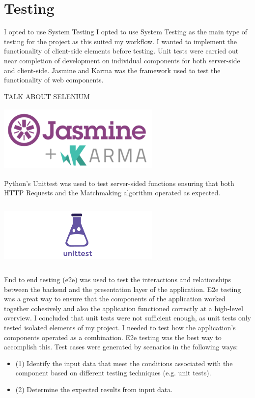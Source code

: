 \section{Testing}
I opted to use System Testing
I opted to use System Testing as the main type of testing for the project as this suited my workflow. I wanted to implement the functionality of client-side elements before testing. Unit tests were carried out near completion of development on individual components for both server-side and client-side. Jasmine and Karma was the framework used to test the functionality of web components.

TALK ABOUT SELENIUM
\begin{center}    
	\includegraphics[width=8cm,height=3.3cm,keepaspectratio]{img/Jasmine_and_Karma.png}
\end{center}
Python’s Unittest was used to test server-sided functions ensuring that both HTTP Requests and the Matchmaking algorithm operated as expected.
\begin{center}    
	\includegraphics[width=8cm,height=3.3cm,keepaspectratio]{img/Unittest.png}
\end{center}
End to end testing (e2e) was used to test the interactions and relationships between the backend and the presentation layer of the application. E2e testing was a great way to ensure that the components of the application worked together cohesively and also the application functioned correctly at a high-level overview. I concluded that unit tests were not sufficient enough, as unit tests only tested isolated elements of my project. I needed to test how the application's components operated as a combination. E2e testing was the best way to accomplish this.
Test cases were generated by scenarios in the following ways:~\cite{bai2001distributed}
\begin{itemize}
	\item (1) Identify the input data that meet the conditions associated with the component based on different testing techniques (e.g. unit tests).
	\item (2) Determine the expected results from input data. 
\end{itemize}
